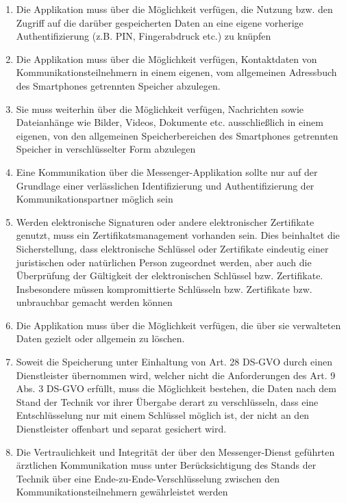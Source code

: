     \begin{enumerate}[label={(\arabic*)}]
        \item Die Applikation muss über die Möglichkeit verfügen, die Nutzung bzw. den Zugriff
    auf die darüber gespeicherten Daten an eine eigene vorherige Authentifizierung (z.B.
    PIN, Fingerabdruck etc.) zu knüpfen
        \item Die Applikation muss über die Möglichkeit verfügen, Kontaktdaten von
    Kommunikationsteilnehmern in einem eigenen, vom allgemeinen Adressbuch des
    Smartphones getrennten Speicher abzulegen.
        \item Sie muss weiterhin über die Möglichkeit verfügen,
    Nachrichten sowie Dateianhänge wie Bilder, Videos, Dokumente etc. ausschließlich
    in einem eigenen, von den allgemeinen Speicherbereichen des Smartphones
    getrennten Speicher in verschlüsselter Form abzulegen
        \item Eine Kommunikation über die Messenger-Applikation sollte nur auf
    der Grundlage einer verlässlichen Identifizierung und Authentifizierung der
    Kommunikationspartner möglich sein
        \item Werden elektronische Signaturen oder andere elektronischer Zertifikate genutzt,
    muss ein Zertifikatsmanagement vorhanden sein. Dies beinhaltet die Sicherstellung,
    dass elektronische Schlüssel oder Zertifikate eindeutig einer juristischen oder
    natürlichen Person zugeordnet werden, aber auch die Überprüfung der Gültigkeit der
    elektronischen Schlüssel bzw. Zertifikate. Insbesondere müssen kompromittierte
    Schlüsseln bzw. Zertifikate bzw. unbrauchbar gemacht werden können
        \item Die Applikation muss über die Möglichkeit verfügen, die über sie verwalteten Daten
    gezielt oder allgemein zu löschen.
        \item Soweit die Speicherung unter Einhaltung von Art. 28 DS-GVO durch einen Dienstleister übernommen wird, welcher nicht die Anforderungen des Art. 9 Abs. 3 DS-GVO erfüllt,
    muss die Möglichkeit bestehen, die Daten nach dem Stand der Technik vor ihrer
    Übergabe derart zu verschlüsseln, dass eine Entschlüsselung nur mit einem
    Schlüssel möglich ist, der nicht an den Dienstleister offenbart und separat gesichert
    wird.
        \item Die Vertraulichkeit und Integrität der über den Messenger-Dienst geführten
    ärztlichen Kommunikation muss unter Berücksichtigung des Stands der Technik
    über eine Ende-zu-Ende-Verschlüsselung zwischen den
    Kommunikationsteilnehmern gewährleistet werden
    \end{enumerate}


